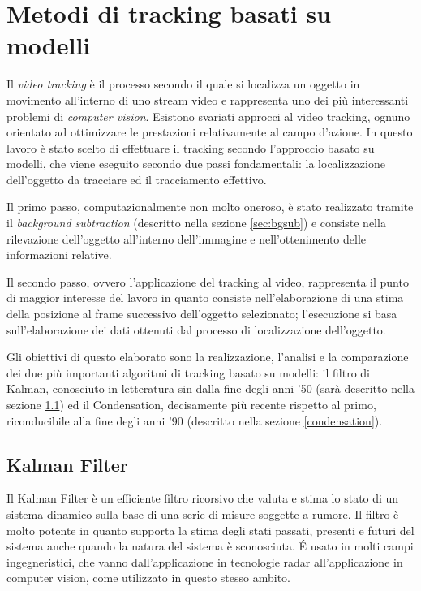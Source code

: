 \section{Metodi di tracking basati su modelli} \label{modelTracking}
Il \textit{video tracking} è il processo secondo il quale si localizza un oggetto in movimento all'interno di uno stream video e rappresenta uno dei più interessanti problemi di \textit{computer vision}. Esistono svariati approcci al video tracking, ognuno orientato ad ottimizzare le prestazioni relativamente al campo d'azione. In questo lavoro è stato scelto di effettuare il tracking secondo l'approccio basato su modelli, che viene eseguito secondo due passi fondamentali: la localizzazione dell'oggetto da tracciare ed il tracciamento effettivo.

Il primo passo, computazionalmente non molto oneroso, è stato realizzato tramite il \textit{background subtraction} (descritto nella sezione \ref{sec:bgsub}) e consiste nella rilevazione dell'oggetto all'interno dell'immagine e nell'ottenimento delle informazioni relative.

Il secondo passo, ovvero l'applicazione del tracking al video, rappresenta il punto di maggior interesse del lavoro in quanto consiste nell'elaborazione di una stima della posizione al frame successivo dell'oggetto selezionato; l'esecuzione si basa sull'elaborazione dei dati ottenuti dal processo di localizzazione dell'oggetto.

Gli obiettivi di questo elaborato sono la realizzazione, l'analisi e la comparazione dei due più importanti algoritmi di tracking basato su modelli: il filtro di Kalman, conosciuto in letteratura sin dalla fine degli anni '50 (sarà descritto nella sezione \ref{kalman}) ed il Condensation, decisamente più recente rispetto al primo, riconducibile alla fine degli anni '90 (descritto nella sezione \ref{condensation}).


\subsection{Kalman Filter}\label{kalman}
Il Kalman Filter\cite{kalman-intro} è un efficiente filtro ricorsivo che valuta e stima lo stato di un sistema dinamico sulla base di una serie di misure soggette a rumore. Il filtro è molto potente in quanto supporta la stima degli stati passati, presenti e futuri del sistema anche quando la natura del sistema è sconosciuta. \'E usato in molti campi ingegneristici, che vanno dall'applicazione in tecnologie radar all'applicazione in computer vision, come utilizzato in questo stesso ambito.
